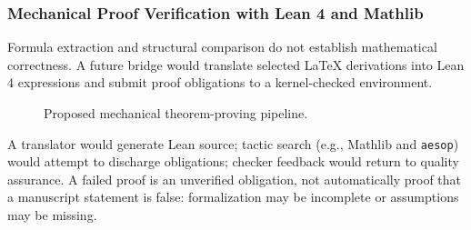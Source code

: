 \documentclass[conference]{IEEEtran}
\begin{document}
\subsubsection{Mechanical Proof Verification with Lean 4 and Mathlib}
Formula extraction and structural comparison do not establish mathematical correctness. A future bridge would translate selected LaTeX derivations into Lean 4 expressions and submit proof obligations to a kernel-checked environment.
\begin{figure}[t]\centering{}\caption{Proposed mechanical theorem-proving pipeline.}\label{fig:lean-pipeline}\end{figure}
A translator would generate Lean source; tactic search (e.g., Mathlib and \texttt{aesop}) would attempt to discharge obligations; checker feedback would return to quality assurance. A failed proof is an unverified obligation, not automatically proof that a manuscript statement is false: formalization may be incomplete or assumptions may be missing.
\end{document}
